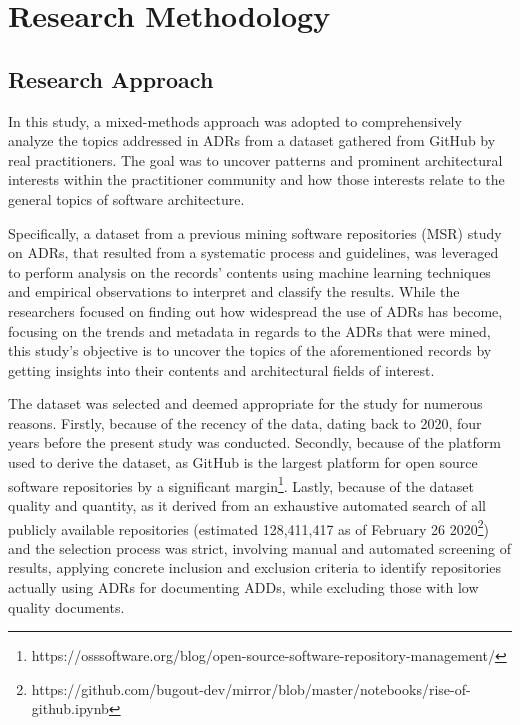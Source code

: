 \chapter{Research Methodology}
    \section{Research Approach}
        In this study, a mixed-methods approach was adopted to comprehensively analyze the topics addressed in ADRs from a dataset gathered from GitHub by real practitioners. The goal was to uncover patterns and prominent architectural interests within the practitioner community and how those interests relate to the general topics of software architecture. 

        Specifically, a dataset from a previous mining software repositories (MSR) study on ADRs, that resulted from a systematic process and guidelines, \cite{Github_study_ADRs, MSR_systematic_process} was leveraged to perform analysis on the records' contents using machine learning techniques and empirical observations to interpret and classify the results. While the researchers focused on finding out how widespread the use of ADRs has become, focusing on the trends and metadata in regards to the ADRs that were mined, this study's objective is to uncover the topics of the aforementioned records by getting insights into their contents and architectural fields of interest.

        The dataset was selected and deemed appropriate for the study for numerous reasons. Firstly, because of the recency of the data, dating back to 2020, four years before the present study was conducted. Secondly, because of the platform used to derive the dataset, as GitHub is the largest platform for open source software repositories by a significant margin\footnote{https://osssoftware.org/blog/open-source-software-repository-management/}. Lastly, because of the dataset quality and quantity, as it derived from an exhaustive automated search of all publicly available repositories  (estimated 128,411,417 as of February 26 2020\footnote{https://github.com/bugout-dev/mirror/blob/master/notebooks/rise-of-github.ipynb}) and the selection process was strict, involving manual and automated screening of results, applying concrete inclusion and exclusion criteria to identify repositories actually using ADRs for documenting ADDs, while excluding those with low quality documents.


